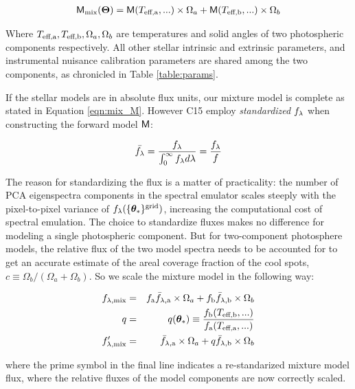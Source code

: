 \documentclass[onecolumn]{emulateapj}%
\newcommand{\iancze}{{\sc C15 }}
\begin{document}
\begin{eqnarray} \label{eqn:mix_M}
\mathsf{M}_{\mathrm{mix}}({\bm \Theta}) = \mathsf{M}(T_\textrm{eff,a}, ...) \times \Omega_a + \mathsf{M}(T_\textrm{eff,b}, ...) \times \Omega_b
\end{eqnarray}


Where $T_\textrm{eff,a}, T_\textrm{eff,b}, \Omega_a, \Omega_b$ are temperatures and solid angles of two photospheric components respectively.  All other stellar intrinsic and extrinsic parameters, and instrumental nuisance calibration parameters are shared among the two components, as chronicled in Table \ref{table:params}.

If the stellar models are in absolute flux units, our mixture model is complete as stated in Equation \ref{eqn:mix_M}.  However \iancze employ \emph{standardized} $f_\lambda$ when constructing the forward model $\mathsf{M}$:


\begin{eqnarray} \label{eqn:normalization}
\bar {f_\lambda} = \frac{f_\lambda}{\int_{0}^{\infty} f_\lambda d\lambda} = \frac{f_\lambda}{f}
\end{eqnarray}

The reason for standardizing the flux is a matter of practicality: the number of PCA eigenspectra components in the spectral emulator scales steeply with the pixel-to-pixel variance of $f_{\lambda}(\{{\bm \theta}_{\ast}\}^\textrm{grid})$, increasing the computational cost of spectral emulation.  The choice to standardize fluxes makes no difference for modeling a single photospheric component.  But for two-component photosphere models, the relative flux of the two model spectra needs to be accounted for to get an accurate estimate of the areal coverage fraction of the cool spots, $c \equiv \Omega_b/(\Omega_a+\Omega_b)$.  So we scale the mixture model in the following way:

\begin{eqnarray} \label{eqn:norm_scaling}
f_{\lambda, \mathrm{mix}} &=& f_{\mathrm{a}} \bar f_{\lambda, \mathrm{a}} \times \Omega_a + f_{\mathrm{b}} \bar f_{\lambda, \mathrm{b}} \times \Omega_b \\
q &=& q({\bm \theta}_{\ast})\equiv \frac{f_{\mathrm{b}}(T_\textrm{eff,b}, ...)}{f_{\mathrm{a}}(T_\textrm{eff,a}, ...)} \\
f_{\lambda, \mathrm{mix}}^{\prime} &=& \bar f_{\lambda, \mathrm{a}} \times \Omega_a + q \bar f_{\lambda, \mathrm{b}} \times \Omega_b
\end{eqnarray}

where the prime symbol in the final line indicates a re-standarized mixture model flux, where the relative fluxes of the model components are now correctly scaled.
\end{document}
